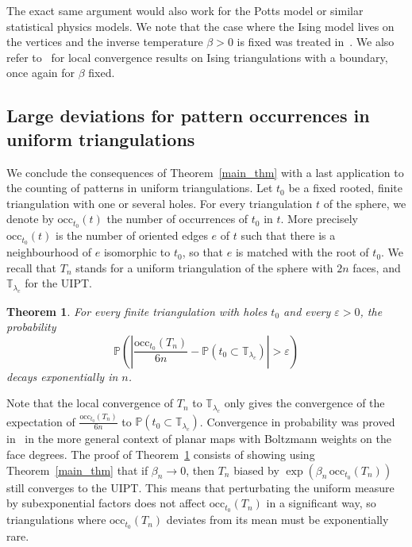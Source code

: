 \documentclass[10pt]{amsart}
\newtheorem{theo}{Theorem}[section]
\theoremstyle{definition}\newtheorem{defi}[theo]{Definition}\newtheorem{rema}[theo]{Remark}\newtheorem{exam}[theo]{Example}\newtheorem{exem}[theo]{Example}\newtheorem{nota}[theo]{Notation}
\newcommand{\eps}{\varepsilon}
\newcommand{\TT}{\mathbb{T}}
\renewcommand{\P}{\mathbb{P}}
\newcommand{\occ}{\mathrm{occ}}
\begin{document}
The exact same argument would also work for the Potts model or similar statistical physics models. We note that the case where the Ising model lives on the vertices and the inverse temperature $\beta>0$ is fixed was treated in~\cite{AMS20}. We also refer to~\cite{CT20, CT20b, CT20c} for local convergence results on Ising triangulations with a boundary, once again for $\beta$ fixed.

\subsection*{Large deviations for pattern occurrences in uniform triangulations}
We conclude the consequences of Theorem~\ref{main_thm} with a last application to the counting of patterns in uniform triangulations. Let $t_0$ be a fixed rooted, finite triangulation with one or several holes. For every triangulation $t$ of the sphere, we denote by $\occ_{t_0}(t)$ the number of occurrences of $t_0$ in $t$. More precisely $\occ_{t_0}(t)$ is the number of oriented edges $e$ of $t$ such that there is a neighbourhood of $e$ isomorphic to $t_0$, so that $e$ is matched with the root of $t_0$. We recall that $T_n$ stands for a uniform triangulation of the sphere with $2n$ faces, and $\TT_{\lambda_c}$ for the UIPT.

\begin{theo}\label{thm_large_deviations}
For every finite triangulation with holes $t_0$ and every $\eps>0$, the probability
\[
\P \left(\left| \frac{\occ_{t_0}(T_n)}{6n} - \P \left(t_0 \subset \TT_{\lambda_c} \right) \right|> \eps \right)
\]
decays exponentially in $n$.
\end{theo}

Note that the local convergence of $T_n$ to $\TT_{\lambda_c}$ only gives the convergence of the expectation of $\frac{\occ_{t_0}(T_n)}{6n}$ to $\P (t_0 \subset \TT_{\lambda_c})$. Convergence in probability was proved in~\cite{BD18} in the more general context of planar maps with Boltzmann weights on the face degrees. The proof of Theorem~\ref{thm_large_deviations} consists of showing using Theorem~\ref{main_thm} that if $\beta_n \to 0$, then $T_n$ biased by $\exp (\beta_n \, \occ_{t_0}(T_n))$ still converges to the UIPT. This means that perturbating the uniform measure by subexponential factors does not affect $\occ_{t_0}(T_n)$ in a significant way, so triangulations where $\occ_{t_0}(T_n)$ deviates from its mean must be exponentially rare.
\end{document}
